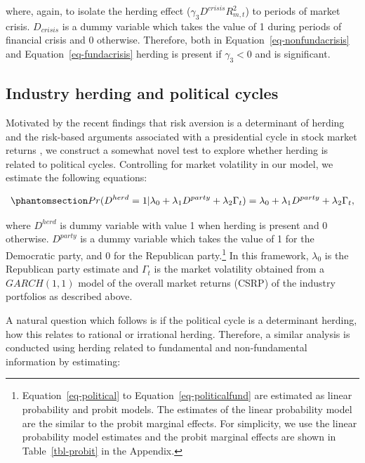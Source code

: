 \documentclass[
  letterpaper,
  DIV=11,
  numbers=noendperiod]{scrartcl}
\begin{document}
where, again, to isolate the herding effect
(\(\gamma_3D^{crisis}R_{m, t}^2\)) to periods of market crisis.
\(D_{crisis}\) is a dummy variable which takes the value of 1 during
periods of financial crisis and 0 otherwise. Therefore, both in
Equation~\ref{eq-nonfundacrisis} and Equation~\ref{eq-fundacrisis}
herding is present if \(\gamma_3 < 0\) and is significant.

\subsection{Industry herding and political
cycles}\label{industry-herding-and-political-cycles}

Motivated by the recent findings that risk aversion is a determinant of
herding \citep{nath2020investor} and the risk-based arguments associated
with a presidential cycle in stock market returns
\citep{pastor2020political}, we construct a somewhat novel test to
explore whether herding is related to political cycles. Controlling for
market volatility in our model, we estimate the following equations:

\begin{equation}\phantomsection\label{eq-political}{
Pr(D^{herd} = 1 |\lambda_0 +  \lambda_1D^{party}  + \lambda_2\Gamma_t) = \lambda_0 +  \lambda_1D^{party}  + \lambda_2\Gamma_t,
}\end{equation}

where \(D^{herd}\) is dummy variable with value 1 when herding is
present and 0 otherwise. \(D^{party}\) is a dummy variable which takes
the value of 1 for the Democratic party, and 0 for the Republican
party.\footnote{Equation~\ref{eq-political} to
  Equation~\ref{eq-politicalfund} are estimated as linear probability
  and probit models. The estimates of the linear probability model are
  the similar to the probit marginal effects. For simplicity, we use the
  linear probability model estimates and the probit marginal effects are
  shown in Table~\ref{tbl-probit} in the Appendix.} In this framework,
\(\lambda_0\) is the Republican party estimate and \(\Gamma_t\) is the
market volatility obtained from a \(GARCH(1,1)\) model of the overall
market returns (CSRP) of the industry portfolios as described above.

A natural question which follows is if the political cycle is a
determinant herding, how this relates to rational or irrational herding.
Therefore, a similar analysis is conducted using herding related to
fundamental and non-fundamental information by estimating:
\end{document}
